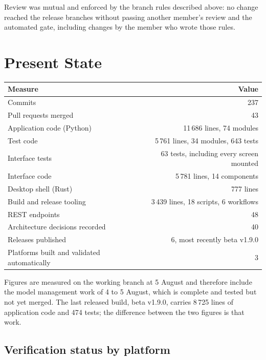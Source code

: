 \documentclass[11pt,a4paper]{article}
\begin{document}
Review was mutual and enforced by the branch rules described above: no change
reached the release branches without passing another member's review and the
automated gate, including changes by the member who wrote those rules.


\section{Present State}

\begin{center}
\small
\begin{tabular}{@{}lr@{}}
\toprule
\textbf{Measure} & \textbf{Value} \\
\midrule
Commits & 237 \\
Pull requests merged & 43 \\
Application code (Python) & 11\,686 lines, 74 modules \\
Test code & 5\,761 lines, 34 modules, 643 tests \\
Interface tests & 63 tests, including every screen mounted \\
Interface code & 5\,781 lines, 14 components \\
Desktop shell (Rust) & 777 lines \\
Build and release tooling & 3\,439 lines, 18 scripts, 6 workflows \\
REST endpoints & 48 \\
Architecture decisions recorded & 40 \\
Releases published & 6, most recently beta v1.9.0 \\
Platforms built and validated automatically & 3 \\
\bottomrule
\end{tabular}
\end{center}

Figures are measured on the working branch at 5 August and therefore include
the model management work of 4 to 5 August, which is complete and tested but
not yet merged. The last released build, beta v1.9.0, carries 8\,725 lines of
application code and 474 tests; the difference between the two figures is that
work.

\subsection{Verification status by platform}
\end{document}
